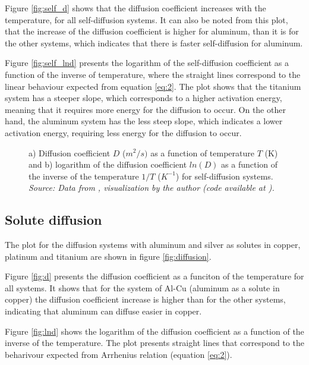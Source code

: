 Figure \ref{fig:self_d} shows that the diffusion coefficient increases with the temperature, for all self-diffusion systems. It can also be noted from this plot, that the increase of the diffusion coefficient is higher for aluminum, than it is for the other systems, which indicates that there is faster self-diffusion for aluminum.

Figure \ref{fig:self_lnd} presents the logarithm of the self-diffusion coefficient as a function of the inverse of temperature, where the straight lines correspond to the linear behaviour expected from equation \ref{eq:2}. The plot shows that the titanium system has a steeper slope, which corresponds to a higher activation energy, meaning that it requires more energy for the diffusion to occur. On the other hand, the aluminum system has the less steep slope, which indicates a lower activation energy, requiring less energy for the diffusion to occur.

\begin{figure}[h]
 \centering
 \caption{a) Diffusion coefficient $D$ ($m^2/s)$ as a function of temperature $T$ (K) and b) logarithm of the diffusion coefficient $ln(D)$ as a function of the inverse of the temperature $1/T$ ($K^{-1}$) for self-diffusion systems. \\
 \textit{Source: Data from \citep{kakusan}, visualization by the author (code available at \citep{mygit}).}}
 \label{fig:self_diffusion}
\end{figure}

\subsection{Solute diffusion}

The plot for the diffusion systems with aluminum and silver as solutes in copper, platinum and titanium are shown in figure \ref{fig:diffusion}.

Figure \ref{fig:d} presents the diffusion coefficient as a funciton of the temperature for all systems. It shows that for the system of Al-Cu (aluminum as a solute in copper) the diffusion coefficient increase is higher than for the other systems, indicating that aluminum can diffuse easier in copper.

Figure \ref{fig:lnd} shows the logarithm of the diffusion coefficient as a function of the inverse of the temperature. The plot presents straight lines that correspond to the beharivour expected from Arrhenius relation (equation \ref{eq:2}). 

